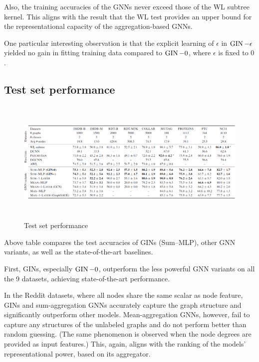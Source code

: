 Also, the training accuracies of the GNNs never exceed those of the WL subtree kernel. This aligns with the result that the WL test provides an upper bound for the representational capacity of the aggregation-based GNNs.

One particular interesting observation is that the explicit learning of $\epsilon$ in $\operatorname{GIN}-\epsilon$ yielded no gain in fitting training data compared to $\operatorname{GIN}-0$, where $\epsilon$ is fixed to $0$.



\subsection{Test set performance}

\begin{figure}[!hbt]
\centering
  \includegraphics[height=6cm]{experiments/fig/fig6.png}
  \caption{Test set performance}
\end{figure}

Above table compares the test accuracies of GINs (Sum–MLP), other GNN variants, as well as the state-of-the-art baselines.

First, GINs, especially $\operatorname{GIN}-0$, outperform the less powerful GNN variants on all the 9 datasets, achieving state-of-the-art performance.

In the Reddit datasets, where all nodes share the same scalar as node feature, GINs and sum-aggregation GNNs accurately capture the graph structure and significantly outperform other models.
Mean-aggregation GNNs, however, fail to capture any structures of the unlabeled graphs and do not perform better than random guessing.
(The same phenomenon is observed when the node degrees are provided as input features.)
This, again, aligns with the ranking of the models’ representational power, based on its aggregator.

